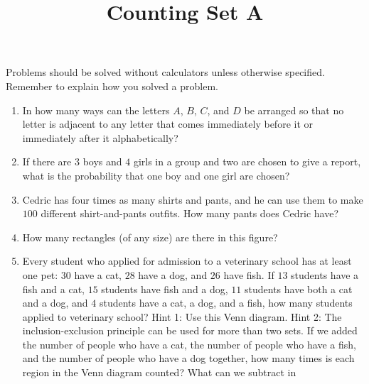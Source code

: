 \documentclass{article}
\title{Counting Set A}
\date{}
\author{}
\begin{document}
\maketitle
\noindent Problems should be solved without calculators unless otherwise 
specified. Remember to explain how you solved a problem.
\begin{enumerate}
    \item In how many ways can the letters $A$, $B$, $C$, and $D$ be 
        arranged so that no letter is adjacent to any letter that comes 
        immediately before it or immediately after it alphabetically?
        \vspace{3cm}
    \item If there are $3$ boys and $4$ girls in a group and two are chosen 
        to give a report, what is the probability that one boy and one girl 
        are chosen?
        \vspace{3cm}
    \item Cedric has four times as many shirts and pants, and he can use 
        them to make $100$ different shirt-and-pants outfits. How many pants 
        does Cedric have?
        \vspace{3cm}
    \item How many rectangles (of any size) are there in this figure?
        \begin{center}
        \end{center}
        \vspace{3cm}
    \item Every student who applied for admission to a veterinary school has 
        at least one pet: $30$ have a cat, $28$ have a dog, and $26$ have 
        fish. If $13$ students have a fish and a cat, $15$ students have 
        fish and a dog, $11$ students have both a cat and a dog, and $4$ 
        students have a cat, a dog, and a fish, how many students applied to 
        veterinary school? Hint 1: Use this Venn diagram. Hint 2: The 
        inclusion-exclusion principle can be used for more than two sets. If we 
        added the number of people who have a cat, the number of people who have 
        a fish, and the number of people who have a dog together, how many times 
        is each region in the Venn diagram counted? What can we subtract in 

\end{enumerate}
\end{document}
